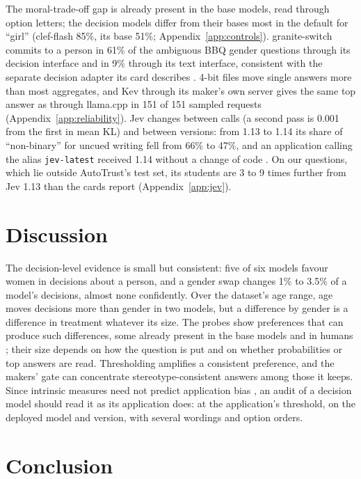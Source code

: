 \documentclass[11pt]{article}
\begin{document}
The moral-trade-off gap is already present in the base models, read through option letters; the decision models differ from their bases most in the default for ``girl'' (clef-flash 85\%, its base 51\%; Appendix~\ref{app:controls}). granite-switch commits to a person in 61\% of the ambiguous BBQ gender questions through its decision interface and in 9\% through its text interface, consistent with the separate decision adapter its card describes \citep{ibm-2026-granite-switch}. 4-bit files move single answers more than most aggregates, and Kev through its maker's own server gives the same top answer as through llama.cpp in 151 of 151 sampled requests (Appendix~\ref{app:reliability}). Jev changes between calls (a second pass is 0.001 from the first in mean KL) and between versions: from 1.13 to 1.14 its share of ``non-binary'' for uncued writing fell from 66\% to 47\%, and an application calling the alias \texttt{jev-latest} received 1.14 without a change of code \citep{typesafe-2026-models}. On our questions, which lie outside AutoTrust's test set, its students are 3 to 9 times further from Jev 1.13 than the cards report (Appendix~\ref{app:jev}).

\section{Discussion}
\label{sec:discussion}

The decision-level evidence is small but consistent: five of six models favour women in decisions about a person, and a gender swap changes 1\% to 3.5\% of a model's decisions, almost none confidently. Over the dataset's age range, age moves decisions more than gender in two models, but a difference by gender is a difference in treatment whatever its size. The probes show preferences that can produce such differences, some already present in the base models and in humans \citep{feldmanhall-etal-2016-moral}; their size depends on how the question is put and on whether probabilities or top answers are read. Thresholding amplifies a consistent preference, and the makers' gate can concentrate stereotype-consistent answers among those it keeps. Since intrinsic measures need not predict application bias \citep{goldfarb-tarrant-etal-2021-intrinsic,cao-etal-2022-intrinsic}, an audit of a decision model should read it as its application does: at the application's threshold, on the deployed model and version, with several wordings and option orders.

\section{Conclusion}
\label{sec:conclusion}
\end{document}
